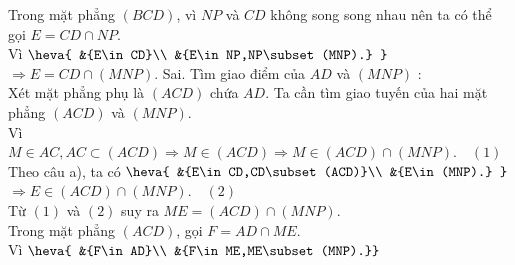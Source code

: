 \begin{ex}
{\begin{itemchoice}
   Trong mặt phẳng $ (BCD)$, vì $ NP$ và  $ CD$ không song song nhau nên ta có thể gọi $ E=CD\cap NP$.\\
   Vì  $\heva{
   &{E\in CD}\\ 
    &{E\in NP,NP\subset (MNP).}
   }$ \\ 
   $\Rightarrow E=CD\cap  (MNP)$.
    \itemch Sai. Tìm giao điểm của $ AD$ và $ (MNP)$ :\\
   Xét mặt  phẳng phụ là $ (ACD)$ chứa $ AD$. Ta cần tìm giao tuyến của hai mặt phẳng $ (ACD)$ và $ (MNP)$.\\
   Vì $ M\in  AC,AC\subset (ACD)\Rightarrow M\in (ACD)\Rightarrow M\in (ACD)\cap (MNP).\quad(1)$\\
   Theo câu  a), ta có $\heva{
   &{E\in  CD,CD\subset (ACD)}\\
   &{E\in  (MNP).}
   }$  \\
   $\Rightarrow E\in (ACD)\cap  (MNP).\quad(2)$\\
   Từ $(1)$ và $(2)$ suy ra $ ME=(ACD)\cap (MNP)$.\\ 
   Trong mặt phẳng $ (ACD)$,  gọi $ F=AD\cap ME$.\\
    Vì $\heva{
   &{F\in AD}\\ 
   &{F\in  ME,ME\subset (MNP).}}$
  \end{itemchoice}
 } 
\end{ex}

